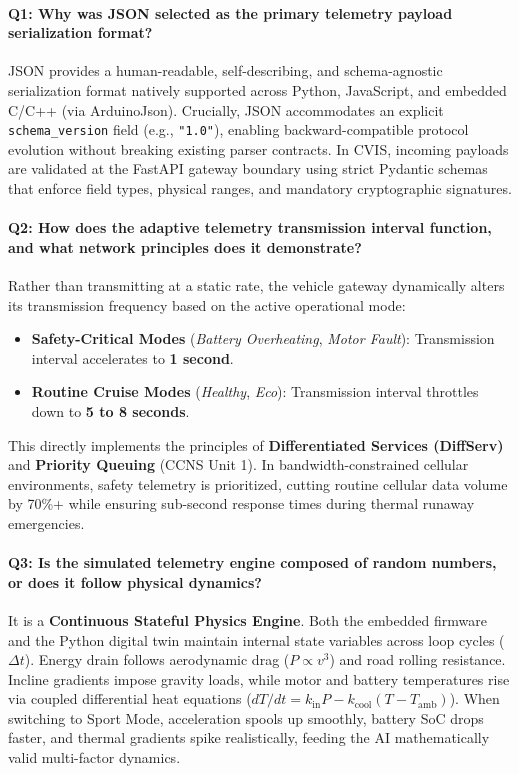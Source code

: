 \documentclass[12pt,a4paper]{report}
\begin{document}
\paragraph{Q1: Why was JSON selected as the primary telemetry payload serialization format?}
JSON provides a human-readable, self-describing, and schema-agnostic serialization format natively supported across Python, JavaScript, and embedded C/C++ (via ArduinoJson). Crucially, JSON accommodates an explicit \texttt{schema\_version} field (e.g., \texttt{"1.0"}), enabling backward-compatible protocol evolution without breaking existing parser contracts. In CVIS, incoming payloads are validated at the FastAPI gateway boundary using strict Pydantic schemas that enforce field types, physical ranges, and mandatory cryptographic signatures.

\paragraph{Q2: How does the adaptive telemetry transmission interval function, and what network principles does it demonstrate?}
Rather than transmitting at a static rate, the vehicle gateway dynamically alters its transmission frequency based on the active operational mode:
\begin{itemize}[leftmargin=*,nosep]
  \item \textbf{Safety-Critical Modes} (\textit{Battery Overheating}, \textit{Motor Fault}): Transmission interval accelerates to \textbf{1 second}.
  \item \textbf{Routine Cruise Modes} (\textit{Healthy}, \textit{Eco}): Transmission interval throttles down to \textbf{5 to 8 seconds}.
\end{itemize}
This directly implements the principles of \textbf{Differentiated Services (DiffServ)} and \textbf{Priority Queuing} (CCNS Unit 1). In bandwidth-constrained cellular environments, safety telemetry is prioritized, cutting routine cellular data volume by 70\%+ while ensuring sub-second response times during thermal runaway emergencies.

\paragraph{Q3: Is the simulated telemetry engine composed of random numbers, or does it follow physical dynamics?}
It is a \textbf{Continuous Stateful Physics Engine}. Both the embedded firmware and the Python digital twin maintain internal state variables across loop cycles ($\Delta t$). Energy drain follows aerodynamic drag ($P \propto v^3$) and road rolling resistance. Incline gradients impose gravity loads, while motor and battery temperatures rise via coupled differential heat equations ($dT/dt = k_{\text{in}} P - k_{\text{cool}} (T - T_{\text{amb}})$). When switching to Sport Mode, acceleration spools up smoothly, battery SoC drops faster, and thermal gradients spike realistically, feeding the AI mathematically valid multi-factor dynamics.
\end{document}
